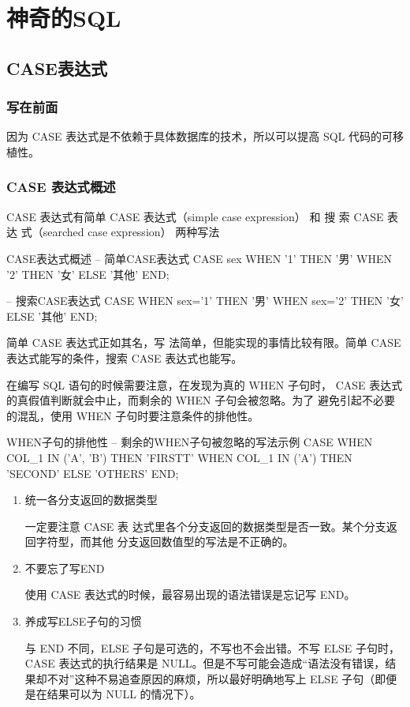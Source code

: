 \chapter{神奇的SQL}
\section{CASE表达式}
\subsection{写在前面}
因为 CASE 表达式是不依赖于具体数据库的技术，所以可以提高 SQL 代码的可移植性。
\subsection{CASE 表达式概述}
CASE 表达式有简单 CASE 表达式（simple case expression） 和 搜 索 CASE 表 达 式（searched case expression）
两种写法
\begin{sql}{CASE表达式概述}
-- 简单CASE表达式 
CASE sex
WHEN '1' THEN '男'
WHEN '2' THEN '女'
ELSE '其他' END;

-- 搜索CASE表达式 
CASE 
WHEN sex='1' THEN '男'
WHEN sex='2' THEN '女'
ELSE '其他' END;
\end{sql}
简单 CASE 表达式正如其名，写
法简单，但能实现的事情比较有限。简单 CASE 表达式能写的条件，搜索
CASE 表达式也能写。

在编写 SQL 语句的时候需要注意，在发现为真的 WHEN 子句时，
CASE 表达式的真假值判断就会中止，而剩余的 WHEN 子句会被忽略。为了
避免引起不必要的混乱，使用 WHEN 子句时要注意条件的排他性。
\begin{sql}{WHEN子句的排他性}
-- 剩余的WHEN子句被忽略的写法示例
CASE 
WHEN COL_1 IN ('A', 'B') THEN 'FIRSTT'
WHEN COL_1 IN ('A') THEN 'SECOND'
     ELSE 'OTHERS' END;
\end{sql}

\cautions

\begin{enumerate}
\item 统一各分支返回的数据类型

一定要注意 CASE 表
达式里各个分支返回的数据类型是否一致。某个分支返回字符型，而其他
分支返回数值型的写法是不正确的。

\item 不要忘了写END

使用 CASE 表达式的时候，最容易出现的语法错误是忘记写 END。

\item 养成写ELSE子句的习惯

与 END 不同，ELSE 子句是可选的，不写也不会出错。不写 ELSE 子句时，
CASE 表达式的执行结果是 NULL。但是不写可能会造成“语法没有错误，结果却不对”这种不易追查原因的麻烦，所以最好明确地写上 ELSE 子句（即便
是在结果可以为 NULL 的情况下）。

\end{enumerate}


